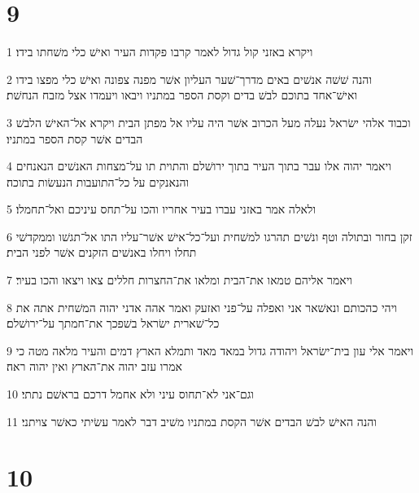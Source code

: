 \chapter{9}

\par 1 ויקרא באזני קול גדול לאמר קרבו פקדות העיר ואישׁ כלי משׁחתו בידו׃
\par 2 והנה שׁשׁה אנשׁים באים מדרך־שׁער העליון אשׁר מפנה צפונה ואישׁ כלי מפצו בידו ואישׁ־אחד בתוכם לבשׁ בדים וקסת הספר במתניו ויבאו ויעמדו אצל מזבח הנחשׁת׃
\par 3 וכבוד אלהי ישׂראל נעלה מעל הכרוב אשׁר היה עליו אל מפתן הבית ויקרא אל־האישׁ הלבשׁ הבדים אשׁר קסת הספר במתניו׃
\par 4 ויאמר יהוה אלו עבר בתוך העיר בתוך ירושׁלם והתוית תו על־מצחות האנשׁים הנאנחים והנאנקים על כל־התועבות הנעשׂות בתוכה׃
\par 5 ולאלה אמר באזני עברו בעיר אחריו והכו על־תחס עיניכם ואל־תחמלו׃
\par 6 זקן בחור ובתולה וטף ונשׁים תהרגו למשׁחית ועל־כל־אישׁ אשׁר־עליו התו אל־תגשׁו וממקדשׁי תחלו ויחלו באנשׁים הזקנים אשׁר לפני הבית׃
\par 7 ויאמר אליהם טמאו את־הבית ומלאו את־החצרות חללים צאו ויצאו והכו בעיר׃
\par 8 ויהי כהכותם ונאשׁאר אני ואפלה על־פני ואזעק ואמר אהה אדני יהוה המשׁחית אתה את כל־שׁארית ישׂראל בשׁפכך את־חמתך על־ירושׁלם׃
\par 9 ויאמר אלי עון בית־ישׂראל ויהודה גדול במאד מאד ותמלא הארץ דמים והעיר מלאה מטה כי אמרו עזב יהוה את־הארץ ואין יהוה ראה׃
\par 10 וגם־אני לא־תחוס עיני ולא אחמל דרכם בראשׁם נתתי׃
\par 11 והנה האישׁ לבשׁ הבדים אשׁר הקסת במתניו משׁיב דבר לאמר עשׂיתי כאשׁר צויתני׃

\chapter{10}

